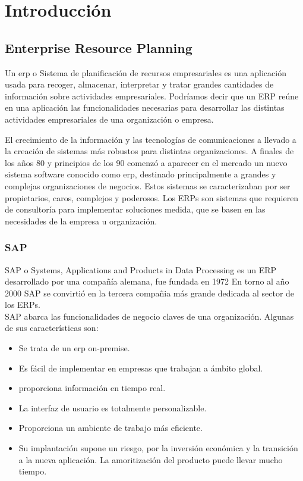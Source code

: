 \chapter{Introducción}


\section[ERP's]{Enterprise Resource Planning}

Un \gls{erp} o Sistema de planificación de recursos empresariales es una aplicación usada para recoger, almacenar,
interpretar y tratar grandes cantidades de información sobre actividades empresariales.
Podríamos decir que un ERP reúne en una aplicación las funcionalidades necesarias para desarrollar las distintas actividades empresariales de una organización o empresa.

El crecimiento de la información y las tecnologías de comunicaciones a llevado a la creación de sistemas más robustos para 
distintas organizaciones. A finales de los años 80 y principios de los 90 comenzó a aparecer en el mercado un nuevo sistema 
software conocido como \acrshort{erp}, destinado principalmente a grandes y complejas organizaciones de negocios. Estos sistemas 
se caracterizaban por ser propietarios, caros, complejos y poderosos.
Los ERPs son sistemas que requieren de consultoría para implementar soluciones medida, que se basen en las necesidades de la empresa u organización. \cite{erp1}


\subsection{SAP}


SAP o  Systems, Applications and Products in Data Processing es un ERP desarrollado por una compañía alemana, fue fundada en 1972
En torno al año 2000 SAP se convirtió en la tercera compañia más grande dedicada al sector de los ERPs.\\

SAP abarca las funcionalidades de negocio claves de una organización. Algunas de sus características son:
\begin{itemize}
	\item Se trata de un \acrshort{erp} \gls{on-premise}.
	\item Es fácil de implementar en empresas que trabajan a ámbito global.
	\item proporciona información en tiempo real.
	\item La interfaz de usuario es totalmente personalizable.
	\item Proporciona un ambiente de trabajo más eficiente.
	
	\item Su implantación supone un riesgo, por la inversión económica y la transición a la nueva aplicación. La amoritización del producto puede llevar mucho tiempo.
\end{itemize}

